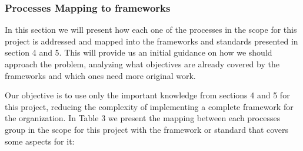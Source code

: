 \subsubsection{Processes Mapping to frameworks}

In this section we will present how each one of the processes in the scope for this project is addressed and mapped into the frameworks and standards presented in section 4 and 5. This will provide us an initial guidance on how we should approach the problem, analyzing what objectives are already covered by the frameworks and which ones need more original work.\par
Our objective is to use only the important knowledge from sections 4 and 5 for this project, reducing the complexity of implementing a complete framework for the organization. In Table 3 we present the mapping between each processes group in the scope for this project with the framework or standard that covers some aspects for it:\par

